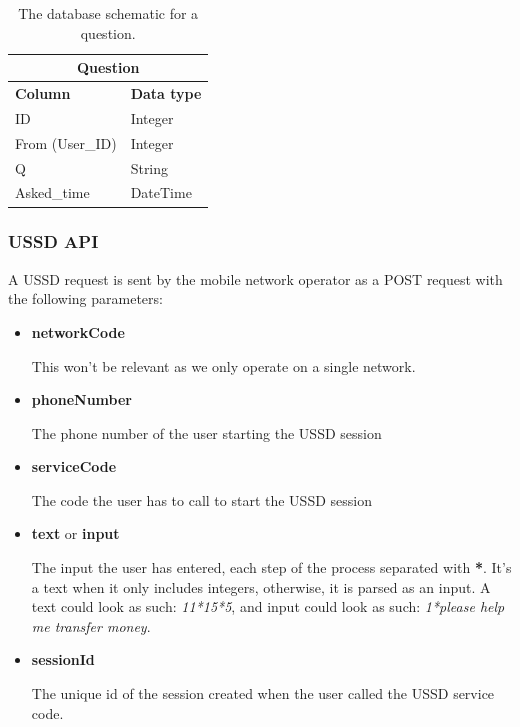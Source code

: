 \documentclass[11pt, a4paper]{article}
\begin{document}
\begin{table}[ht]
\begin{tabular}{ll}
\hline
\multicolumn{2}{|c|}{\textbf{Question}}                                                   \\ \hline
\multicolumn{1}{|l|}{\textbf{Column}}& \multicolumn{1}{l|}{\textbf{Data type}} \\ \hline
\multicolumn{1}{|l|}{ID}             & \multicolumn{1}{l|}{Integer} \\ \hline
\multicolumn{1}{|l|}{From (User\_ID)} & \multicolumn{1}{l|}{Integer} \\ \hline
\multicolumn{1}{|l|}{Q}   & \multicolumn{1}{l|}{String} \\ \hline
\multicolumn{1}{|l|}{Asked\_time}  & \multicolumn{1}{l|}{DateTime} \\ \hline
\end{tabular}
\caption{The database schematic for a question.}
\label{tab: question}
\end{table}

\subsubsection{USSD API}
A USSD request is sent by the mobile network operator as a POST request with the following parameters:
\begin{itemize}
  \item \textbf{networkCode}

  This won't be relevant as we only operate on a single network.

  \item \textbf{phoneNumber}

  The phone number of the user starting the USSD session

  \item \textbf{serviceCode}

  The code the user has to call to start the USSD session

  \item \textbf{text} or \textbf{input}

  The input the user has entered, each step of the process separated with \textbf{*}. It's a text when it only includes integers, otherwise, it is parsed as an input. A text could look as such: \textit{11*15*5}, and input could look as such: \textit{1*please help me transfer money}.

  \item \textbf{sessionId}

  The unique id of the session created when the user called the USSD service code.
\end{itemize}
\end{document}
